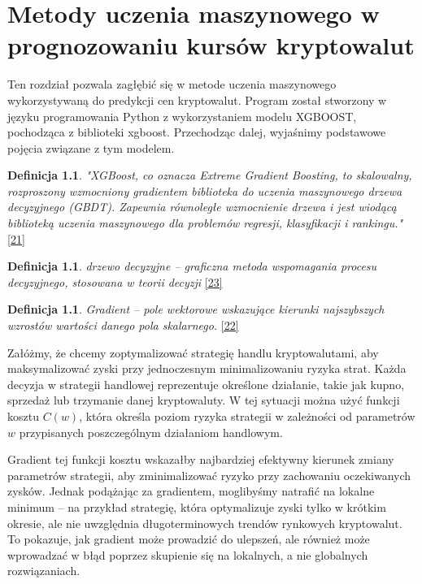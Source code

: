 \documentclass[12pt,a4paper,twoside, inzynierska]{pwr_wmat_praca_dyplomowa}
\theoremstyle{plain}
\numberwithin{theorem}{chapter}
\theoremstyle{definition}
\numberwithin{theorem}{chapter}
\newtheorem{definition}[theorem]{Definicja}
\begin{document}
	 	

	\chapter{Metody uczenia maszynowego w prognozowaniu kursów kryptowalut}
	
	Ten rozdział pozwala zagłębić się w metode uczenia maszynowego wykorzystywaną do predykcji cen kryptowalut. Program został stworzony w języku programowania Python z wykorzystaniem modelu XGBOOST, pochodząca z biblioteki xgboost. Przechodząc dalej, wyjaśnimy podstawowe pojęcia związane z tym modelem. \newline
	
	\begin{definition} 
	   \emph{"XGBoost, co oznacza Extreme Gradient Boosting, to skalowalny, rozproszony wzmocniony gradientem biblioteka do uczenia maszynowego drzewa decyzyjnego (GBDT). Zapewnia równoległe wzmocnienie drzewa i jest wiodącą biblioteką uczenia maszynowego dla problemów regresji, klasyfikacji i rankingu."} \hyperref[info21]{[21]}
	\end{definition}

	\begin{definition} 
		\textit{drzewo decyzyjne – graficzna metoda wspomagania procesu decyzyjnego, stosowana w teorii decyzji} \hyperref[info23]{[23]}
	\end{definition}

	\begin{definition} 
		\textit{Gradient – pole wektorowe wskazujące kierunki najszybszych wzrostów wartości danego pola skalarnego.} \hyperref[info22]{[22]}
	\end{definition}
	
	Załóżmy, że chcemy zoptymalizować strategię handlu kryptowalutami, aby maksymalizować zyski przy jednoczesnym minimalizowaniu ryzyka strat. Każda decyzja w strategii handlowej reprezentuje określone działanie, takie jak kupno, sprzedaż lub trzymanie danej kryptowaluty. W tej sytuacji można użyć funkcji kosztu \( C(w) \), która określa poziom ryzyka strategii w zależności od parametrów \( w \) przypisanych poszczególnym działaniom handlowym.
	
	Gradient tej funkcji kosztu wskazałby najbardziej efektywny kierunek zmiany parametrów strategii, aby zminimalizować ryzyko przy zachowaniu oczekiwanych zysków. Jednak podążając za gradientem, moglibyśmy natrafić na lokalne minimum – na przykład strategię, która optymalizuje zyski tylko w krótkim okresie, ale nie uwzględnia długoterminowych trendów rynkowych kryptowalut. To pokazuje, jak gradient może prowadzić do ulepszeń, ale również może wprowadzać w błąd poprzez skupienie się na lokalnych, a nie globalnych rozwiązaniach.
	
\end{document}
